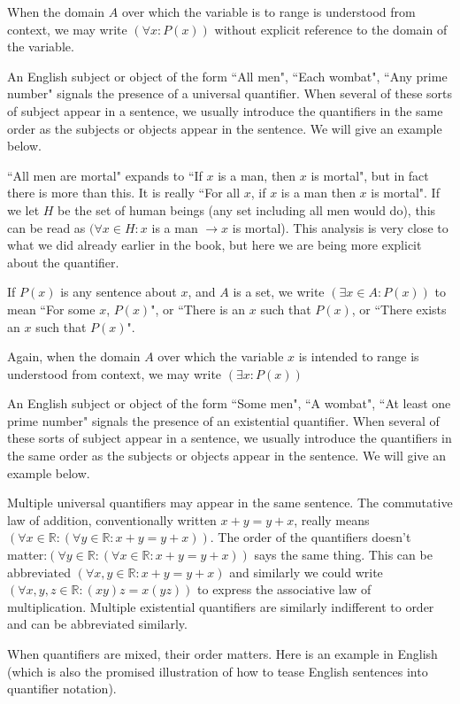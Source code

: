\documentclass[12pt]{article}
\begin{document}
When the domain $A$ over which the variable is to range is understood from context, we may write
$(\forall x:P(x))$ without explicit reference to the domain of the variable.

An English subject or object of the form ``All men",  ``Each wombat", ``Any prime number" signals the presence of a universal quantifier.
When several of these sorts of subject appear in a sentence, we usually introduce the quantifiers in the same order as the subjects or objects
appear in the sentence.  We will give an example below.

``All men are mortal" expands to ``If $x$ is a man, then $x$ is mortal", but in fact there is more than this.  It is really ``For all $x$, if $x$ is a man then $x$ is mortal".  If we let $H$ be the set of human beings (any set including all men would do), this can be read as $(\forall x \in H:x$ is a man $\rightarrow x$ is mortal).  This analysis is very close to what we did already earlier in the book, but here we are being more explicit about the quantifier.

If $P(x)$ is any sentence about $x$, and $A$ is a set, we write $(\exists x \in A:P(x))$ to mean ``For some $x$, $P(x)$", or ``There is an $x$ such that $P(x)$, or ``There exists an $x$ such that $P(x)$".

Again, when the domain $A$ over which the variable $x$ is intended to range is understood from context, we may write 
$(\exists x:P(x))$

An English subject or object of the form ``Some men",  ``A wombat", ``At least one prime number" signals the presence of an existential quantifier.
When several of these sorts of subject appear in a sentence, we usually introduce the quantifiers in the same order as the subjects or objects
appear in the sentence.  We will give an example below.

Multiple universal quantifiers may appear in the same sentence.  The commutative law of addition, conventionally written $x+y=y+x$, really means
$(\forall x \in {\mathbb R}:(\forall y \in {\mathbb R}: x+y=y+x))$.  The order of the quantifiers doesn't matter:$(\forall y \in {\mathbb R}:(\forall x \in {\mathbb R}: x+y=y+x))$ says the same thing.  This can be abbreviated $(\forall x,y\in {\mathbb R}:x+y=y+x)$ and similarly we could write $(\forall x,y,z\in {\mathbb R}:(xy)z=x(yz))$ to express the associative law of multiplication.  Multiple existential quantifiers are similarly indifferent to order and can be abbreviated similarly.

When quantifiers are mixed, their order matters.  Here is an example in English (which is also the promised illustration of how to tease English sentences into quantifier notation).
\end{document}
